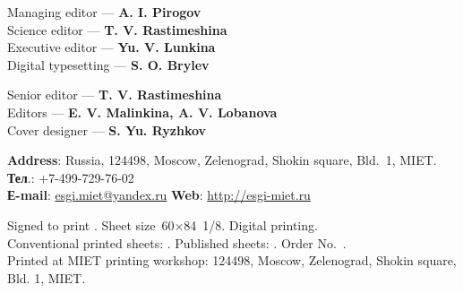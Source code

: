 \begin{otherlanguage}{english}
\begin{minipage}[t]{.48\textwidth}
\begin{flushleft}
  \footnotesize
        Managing editor — \textbf{A. I. Pirogov}\\
Science editor — \textbf{T. V. Rastimeshina} \\
Executive editor — \textbf{Yu. V. Lunkina }\\
Digital typesetting — \textbf{S. O. Brylev}
    \end{flushleft}
\end{minipage}\hspace{0.04\textwidth}
\begin{minipage}[t]{.48\textwidth}
    \begin{flushleft}
        \footnotesize
        Senior editor — \textbf{T. V. Rastimeshina}\\
        Editors — \textbf{E. V. Malinkina, A. V. Lobanova}\\
        Cover designer — \textbf{S. Yu. Ryzhkov}
    \end{flushleft}
\end{minipage}

\begin{flushleft}
    \footnotesize
    \textbf{Address}: Russia, 124498, Moscow, Zelenograd, Shokin square, Bld. 1, MIET.\\
    \textbf{Тел}.: +7-499-729-76-02\\
    \textbf{Е-mail}: \href{mailto:esgi.miet@yandex.ru}{esgi.miet@yandex.ru} \hspace{3em}
    \textbf{Web}: \url{http://esgi-miet.ru}

     \vspace{1em}
    Signed to print \esgiPDate. Sheet size 60\(×\)84 1/8. Digital printing.\\
    Conventional printed sheets: \esgiUPL{}. Published sheets: \esgiUIL{}. Order No.~\esgiPRN{}.\\
    Printed at MIET printing workshop: 124498, Moscow, Zelenograd, Shokin square, Bld. 1, MIET.
\end{flushleft}

\end{otherlanguage}

\normalsize
\setmainlinespread

